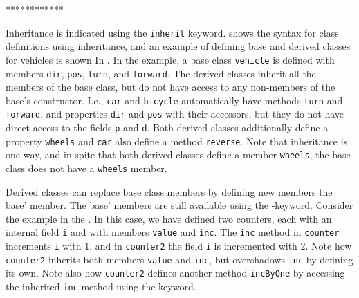 ************

Inheritance is indicated using the \lstinline[language=syntax]{inherit} keyword.  shows the syntax for class definitions using inheritance, and an example of defining base and derived classes for vehicles is shown In .
%
%
In the example, a base class \lstinline{vehicle} is defined with members \lstinline{dir}, \lstinline{pos}, \lstinline{turn}, and \lstinline{forward}. The derived classes inherit all the members of the base class, but do not have access to any non-members of the base's constructor. I.e., \lstinline{car} and \lstinline{bicycle} automatically have methods \lstinline{turn} and \lstinline{forward}, and properties \lstinline{dir} and \lstinline{pos} with their accessors, but they do not have direct access to the fields \lstinline{p} and \lstinline{d}. Both derived classes additionally define a property \lstinline{wheels} and \lstinline{car} also define a method \lstinline{reverse}. Note that inheritance is one-way, and in spite that both derived classes define a member \lstinline{wheels}, the base class does not have a \lstinline{wheels} member.

Derived classes can replace base class members by defining new members  the base' member. The base' members are still available using the -keyword. Consider the example in the .
%
%
In this case, we have defined two counters, each with an internal field \lstinline{i} and with members \lstinline{value} and \lstinline{inc}. The \lstinline{inc} method in \lstinline{counter} increments \lstinline{i} with 1, and in \lstinline{counter2} the field \lstinline{i} is incremented with 2. Note how \lstinline{counter2} inherits both members \lstinline{value} and \lstinline{inc}, but overshadows \lstinline{inc} by defining its own. Note also how \lstinline{counter2} defines another method \lstinline{incByOne} by accessing the inherited \lstinline{inc} method using the  keyword.


